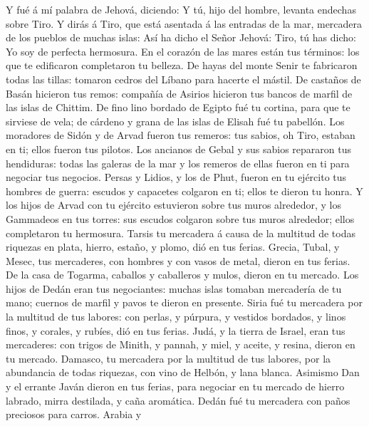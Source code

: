  Y fué á mí palabra de Jehová, diciendo:  Y tú,
hijo del hombre, levanta endechas sobre Tiro.  Y dirás á
Tiro, que está asentada á las entradas de la mar, mercadera de los
pueblos de muchas islas: Así ha dicho el Señor Jehová: Tiro, tú has
dicho: Yo soy de perfecta hermosura.  En el corazón de las
mares están tus términos: los que te edificaron completaron tu belleza.
 De hayas del monte Senir te fabricaron todas las tillas:
tomaron cedros del Líbano para hacerte el mástil.  De
castaños de Basán hicieron tus remos: compañía de Asirios hicieron tus
bancos de marfil de las islas de Chittim.  De fino lino
bordado de Egipto fué tu cortina, para que te sirviese de vela; de
cárdeno y grana de las islas de Elisah fué tu pabellón.  Los
moradores de Sidón y de Arvad fueron tus remeros: tus sabios, oh Tiro,
estaban en ti; ellos fueron tus pilotos.  Los ancianos de
Gebal y sus sabios repararon tus hendiduras: todas las galeras de la mar
y los remeros de ellas fueron en ti para negociar tus negocios.
 Persas y Lidios, y los de Phut, fueron en tu ejército tus
hombres de guerra: escudos y capacetes colgaron en ti; ellos te dieron
tu honra.  Y los hijos de Arvad con tu ejército estuvieron
sobre tus muros alrededor, y los Gammadeos en tus torres: sus escudos
colgaron sobre tus muros alrededor; ellos completaron tu hermosura.
 Tarsis tu mercadera á causa de la multitud de todas
riquezas en plata, hierro, estaño, y plomo, dió en tus ferias.
 Grecia, Tubal, y Mesec, tus mercaderes, con hombres y con
vasos de metal, dieron en tus ferias.  De la casa de
Togarma, caballos y caballeros y mulos, dieron en tu mercado.
 Los hijos de Dedán eran tus negociantes: muchas islas
tomaban mercadería de tu mano; cuernos de marfil y pavos te dieron en
presente.  Siria fué tu mercadera por la multitud de tus
labores: con perlas, y púrpura, y vestidos bordados, y linos finos, y
corales, y rubíes, dió en tus ferias.  Judá, y la tierra de
Israel, eran tus mercaderes: con trigos de Minith, y pannah, y miel, y
aceite, y resina, dieron en tu mercado.  Damasco, tu
mercadera por la multitud de tus labores, por la abundancia de todas
riquezas, con vino de Helbón, y lana blanca.  Asimismo Dan
y el errante Javán dieron en tus ferias, para negociar en tu mercado de
hierro labrado, mirra destilada, y caña aromática.  Dedán
fué tu mercadera con paños preciosos para carros.  Arabia y
